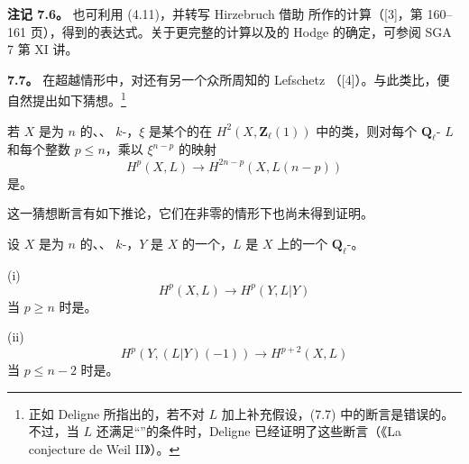 \textbf{注记 7.6。} 也可利用 (4.11)，并转写 Hirzebruch 借助 所作的计算（[3]，第 160--161 页），得到的表达式。关于更完整的计算以及的 Hodge 的确定，可参阅 SGA 7 第 XI 讲。

\textbf{7.7。} 在超越情形中，对还有另一个众所周知的 Lefschetz （[4]）。与此类比，便自然提出如下猜想。\footnote{正如 Deligne 所指出的，若不对 $L$ 加上补充假设，(7.7) 中的断言是错误的。不过，当 $L$ 还满足“”的条件时，Deligne 已经证明了这些断言（《La conjecture de Weil II》）。}

若 $X$ 是为 $n$ 的、、 $k$-，$\xi$ 是某个的在 $H^2(X,\mathbf Z_\ell(1))$ 中的类，则对每个 $\mathbf Q_\ell$- $L$ 和每个整数 $p\le n$，乘以 $\xi^{n-p}$ 的映射
\[
 H^p(X,L)\longrightarrow H^{2n-p}(X,L(n-p))
\]
是。

这一猜想断言有如下推论，它们在非零的情形下也尚未得到证明。

设 $X$ 是为 $n$ 的、、 $k$-，$Y$ 是 $X$ 的一个，$L$ 是 $X$ 上的一个 $\mathbf Q_\ell$-。

(i) 
\[
 H^p(X,L)\longrightarrow H^p(Y,L|Y)
\]
当 $p\ge n$ 时是。

(ii) 
\[
 H^p(Y,(L|Y)(-1))\longrightarrow H^{p+2}(X,L)
\]
当 $p\le n-2$ 时是。

